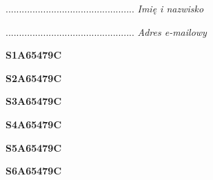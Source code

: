 \begin{turn}{90}\begin{minipage}{\linewidth} \vspace{20mm} ................................................  \textit{Imię i nazwisko}\end{minipage}\end{turn}

\begin{turn}{90}\begin{minipage}{\linewidth} \vspace{20mm} ................................................  \textit{Adres e-mailowy}\end{minipage}\end{turn}

\begin{turn}{90}\huge \begin{minipage}{\linewidth} \vspace{10mm}\textbf{S1A65479C}\end{minipage}\end{turn}

\begin{turn}{90}\huge \begin{minipage}{\linewidth} \vspace{10mm}\textbf{S2A65479C}\end{minipage}\end{turn}

\begin{turn}{90}\huge \begin{minipage}{\linewidth} \vspace{10mm}\textbf{S3A65479C}\end{minipage}\end{turn}

\begin{turn}{90}\huge \begin{minipage}{\linewidth} \vspace{10mm}\textbf{S4A65479C}\end{minipage}\end{turn}

\begin{turn}{90}\huge \begin{minipage}{\linewidth} \vspace{10mm}\textbf{S5A65479C}\end{minipage}\end{turn}

\begin{turn}{90}\huge \begin{minipage}{\linewidth} \vspace{10mm}\textbf{S6A65479C}\end{minipage}\end{turn}

